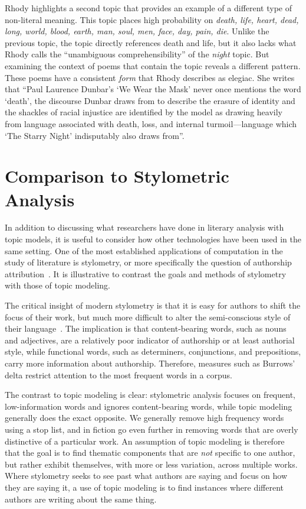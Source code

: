 {Rhody highlights a second topic that provides an example of a different type of non-literal meaning.
This topic places high probability on {\em death, life, heart, dead, long, world, blood, earth, man, soul, men, face, day, pain, die}.
Unlike the previous topic, the topic directly references death and life, but it also lacks what Rhody calls the ``unambiguous comprehensibility'' of the {\em night} topic.
But examining the context of poems that contain the topic reveals a different pattern.
These poems have a consistent {\em form} that Rhody describes as elegiac.
She writes that ``Paul Laurence Dunbar's `We Wear the Mask' never once mentions the word `death', the discourse Dunbar draws from to describe the erasure of identity and the shackles of racial injustice are identified by the model as drawing heavily from language associated with death, loss, and internal turmoil---language which `The Starry Night' indisputably also draws from''.

\section{Comparison to Stylometric Analysis}

In addition to discussing what researchers have done in literary analysis with topic models, it is useful to consider how other technologies have been used in the same setting.
One of the most established applications of computation in the study of literature is stylometry, or more specifically the question of authorship attribution~\citep{juola2006authorship}.
It is illustrative to contrast the goals and methods of stylometry with those of topic modeling.

The critical insight of modern stylometry is that it is easy for authors to shift the focus of their work, but much more difficult to alter the semi-conscious style of their language~\citep{mosteller1964inference}.
The implication is that content-bearing words, such as nouns and adjectives, are a relatively poor indicator of authorship or at least authorial style, while functional words, such as determiners, conjunctions, and prepositions, carry more information about authorship.
Therefore, measures such as Burrows' delta \citep{burrows2002delta} restrict attention to the most frequent words in a corpus.

The contrast to topic modeling is clear: stylometric analysis focuses on frequent, low-information words and ignores content-bearing words, while topic modeling generally does the exact opposite.
We generally remove high frequency words using a stop list, and in fiction go even further in removing words that are overly distinctive of a particular work.
An assumption of topic modeling is therefore that the goal is to find thematic components that are {\em not} specific to one author, but rather exhibit themselves, with more or less variation, across multiple works.
Where stylometry seeks to see past what authors are saying and focus on how they are saying it, a use of topic modeling is to find instances where different authors are writing about the same thing.

}
